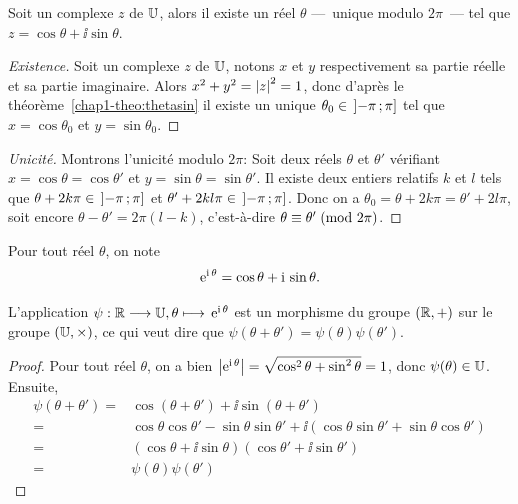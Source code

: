 \begin{prop}\label{prop:expsurj}
  Soit un complexe \(z\) de \(\mathbb{U}\), alors il existe un réel \(\theta\)
  ---~unique modulo \(2\pi\)~--- tel que \(z = \cos\theta  +
  \ii\sin\theta\).
\end{prop}

\begin{proof}[Existence]
  Soit un complexe \(z\) de \(\mathbb{U}\), notons \(x\) et \(y\) respectivement sa
  partie réelle et sa partie imaginaire. Alors \(x^2 + y^2 = \left\lvert z\right\rvert^2 = 1\),
  donc d'après le théorème~\ref{chap1-theo:thetasin} il existe un unique
  \(\theta_0 \in{}\left] -\pi \, ; {} \pi \right]\) tel que \(x = \cos\theta_0\) et
  \(y = \sin\theta_0\).
\end{proof}

\begin{proof}[Unicité]
  Montrons l'unicité modulo \(2\pi\): Soit deux réels \(\theta\) et
  \(\theta'\) vérifiant  \(x = \cos{\theta} = \cos{\theta'}\) et \(y =
  \sin{\theta} = \sin{\theta'}\). Il existe deux entiers relatifs \(k\) et \(l\) tels
  que \(\theta+2k\pi\in{}\left] -\pi \, ; {} \pi \right]\) et
  \(\theta'+2kl\pi\in{}\left] -\pi \, ; {} \pi \right]\). Donc on a
  \(\theta_0=\theta+2k\pi={\theta'}+2l\pi\), soit encore
  \(\theta-\theta'=2\pi(l-k)\), c'est-à-dire \(\theta \equiv \theta'\!\pmod {2\pi}\).
\end{proof}

\begin{defdef}
  Pour tout réel \(\theta\), on note
  \begin{equation}
    \operatorname{e}^{\operatorname{i} \theta} = \cos{\theta}+\operatorname{i}{}\sin{\theta}.
  \end{equation}
\end{defdef}

\begin{prop}
  L'application \(\psi:\mathbb{R} \longrightarrow{} \mathbb{U}, \theta \longmapsto{} \operatorname{e}^{\operatorname{i} \theta}\) est un
  morphisme du groupe \((\mathbb{R}, + )\) sur le groupe \((\mathbb{U},\times)\), ce qui veut
  dire que \(\psi(\theta + \theta') = \psi(\theta)\psi(\theta')\).
\end{prop}

\begin{proof}
  Pour tout réel \(\theta\), on a bien \(\left\lvert\operatorname{e}^{\operatorname{i} \theta}\right\rvert = \sqrt{\cos^2
  \theta + \sin^2 \theta} = 1\), donc \(\psi(\theta) \in{}\mathbb{U}\). Ensuite,
  \begin{align*}
    \psi(\theta  + \theta') = &\cos(\theta  + \theta') + \ii{}\sin(\theta +
    \theta')\\
    = &\cos \theta \cos \theta' - \sin \theta \sin \theta'  + \ii(\cos
    \theta \sin \theta' + \sin \theta \cos \theta')\\
    = &(\cos \theta + \ii{}\sin \theta)(\cos \theta' + \ii{}\sin \theta')\\
    = &\psi(\theta) \psi(\theta')
  \end{align*}
\end{proof}

